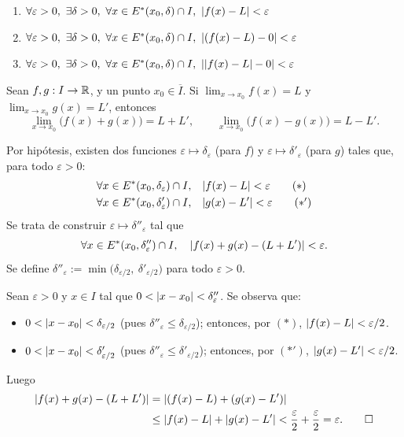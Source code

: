 \documentclass[11pt,a4paper]{article}
\newcommand{\Er}{E^{*}}                 %
\newcommand{\Cl}[1]{\overline{#1}}      %
\begin{document}
\begin{demo}
\begin{enumerate}[label=(\arabic*)]
  \item $\forall\varepsilon>0,\ \exists\delta>0,\ \forall x\in\Er(x_0,\delta)\cap I,\ \abs{f(x)-L}<\varepsilon$
  \item $\forall\varepsilon>0,\ \exists\delta>0,\ \forall x\in\Er(x_0,\delta)\cap I,\ \abs{(f(x)-L)-0}<\varepsilon$
  \item $\forall\varepsilon>0,\ \exists\delta>0,\ \forall x\in\Er(x_0,\delta)\cap I,\ \abs{\abs{f(x)-L}-0}<\varepsilon$ \qedhere
\end{enumerate}
\end{demo}

\begin{proposicion}
Sean $f,g:I\to\mathbb{R}$, y un punto $x_0\in\Cl{I}$. Si $\displaystyle\lim_{x\to x_0}f(x)=L$ y $\displaystyle\lim_{x\to x_0}g(x)=L'$, entonces
\[
  \lim_{x\to x_0}\big(f(x)+g(x)\big)=L+L', \qquad \lim_{x\to x_0}\big(f(x)-g(x)\big)=L-L'.
\]
\end{proposicion}

\begin{demo}
Por hipótesis, existen dos funciones $\varepsilon\mapsto\delta_\varepsilon$ (para $f$) y $\varepsilon\mapsto\delta'_\varepsilon$ (para $g$) tales que, para todo $\varepsilon>0$:
\begin{align*}
  \forall x\in\Er(x_0,\delta_\varepsilon)\cap I,&\quad \abs{f(x)-L}<\varepsilon \tag{$*$}\\
  \forall x\in\Er(x_0,\delta'_\varepsilon)\cap I,&\quad \abs{g(x)-L'}<\varepsilon \tag{$*'$}
\end{align*}
Se trata de construir $\varepsilon\mapsto\delta''_\varepsilon$ tal que
\[
  \forall x\in\Er(x_0,\delta''_\varepsilon)\cap I,\quad \abs{f(x)+g(x)-(L+L')}<\varepsilon.
\]
Se define $\delta''_\varepsilon := \min\big(\delta_{\varepsilon/2},\ \delta'_{\varepsilon/2}\big)$ para todo $\varepsilon>0$.

Sean $\varepsilon>0$ y $x\in I$ tal que $0<\lvert x-x_0\rvert<\delta''_\varepsilon$. Se observa que:
\begin{itemize}
  \item $0<\lvert x-x_0\rvert<\delta_{\varepsilon/2}$ (pues $\delta''_\varepsilon\leq\delta_{\varepsilon/2}$); entonces, por $(*)$, $\lvert f(x)-L\rvert<\varepsilon/2$.
  \item $0<\lvert x-x_0\rvert<\delta'_{\varepsilon/2}$ (pues $\delta''_\varepsilon\leq\delta'_{\varepsilon/2}$); entonces, por $(*')$, $\lvert g(x)-L'\rvert<\varepsilon/2$.
\end{itemize}
Luego
\begin{align*}
  \lvert f(x)+g(x)-(L+L')\rvert &= \lvert(f(x)-L)+(g(x)-L')\rvert\\
  &\leq \lvert f(x)-L\rvert + \lvert g(x)-L'\rvert < \frac{\varepsilon}{2}+\frac{\varepsilon}{2} = \varepsilon. \qedhere
\end{align*}
\end{demo}
\end{document}
